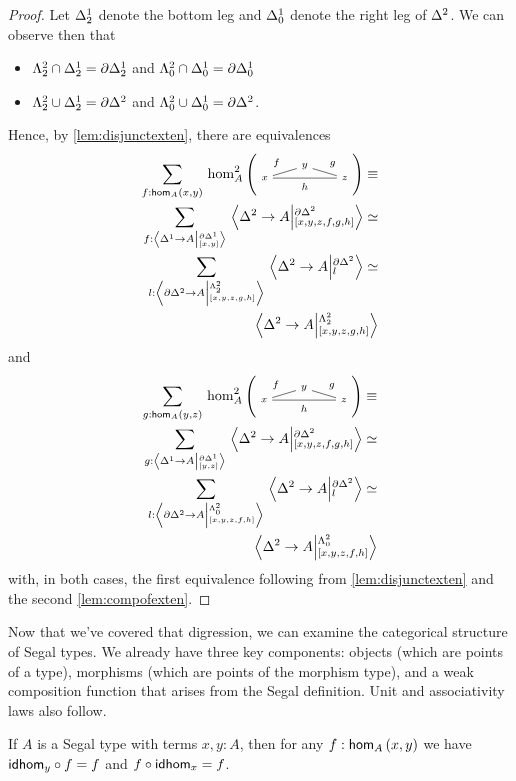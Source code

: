 \documentclass[main.tex]{subfiles}
\begin{document}
    \begin{proof}
        Let $\osx_{2}$ denote the bottom leg and $\osx_{0}$ denote the right leg of $\tsx$. We can observe then that 
        \begin{itemize}
            \item $\tthorn \cap \osx_{2} = \partial \osx_{2}$ and $\tzhorn \cap \osx_{0} = \partial \osx_{0}$
            \item $\tthorn \cup \osx_{2} = \pardt$ and $\tzhorn \cup \osx_{0} = \pardt$.
        \end{itemize}
        Hence, by \cref{lem:disjunctexten}, there are equivalences
        \begin{align*}
            \sm{f : \ho[A]{x}{y}}\homtwo{A}(x,y,z,f,g,h) \equiv \\
            \sm{f : \ndexten{\osx}{A}{\pardo}{[x,y]}}\ndexten{\tsx}{A}{\pardt}{[x,y,z,f,g,h]} \simeq \\
            \sm{l : \ndexten{\pardt}{A}{\tthorn}{[x,y,z,g,h]}}\ndexten{\tsx}{A}{\pardt}{l} \simeq\\ 
            \ndexten{\tsx}{A}{\tthorn}{[x,y,z,g,h]}
        \end{align*}
        and 
        \begin{align*}
            \sm{g : \ho[A]{y}{z}}\homtwo{A}(x,y,z,f,g,h)\equiv \\
            \sm{g : \ndexten{\osx}{A}{\pardo}{[y,z]}}\ndexten{\tsx}{A}{\pardt}{[x,y,z,f,g,h]} \simeq \\
            \sm{l : \ndexten{\pardt}{A}{\tzhorn}{[x,y,z,f,h]}}\ndexten{\tsx}{A}{\pardt}{l} \simeq \\
            \ndexten{\tsx}{A}{\tzhorn}{[x,y,z,f,h]}
        \end{align*}
        with, in both cases, the first equivalence following from \cref{lem:disjunctexten} and the second \cref{lem:compofexten}.
    \end{proof}

Now that we've covered that digression, we can examine the categorical structure of Segal types. We already have three key components: objects (which are points of a type), morphisms (which are points of the morphism type), and a weak composition function that arises from the Segal definition. Unit and associativity laws also follow.

\begin{lemma}
    If $A$ is a Segal type with terms $x,y : A$, then for any $f : \ho[A]{x}{y}$ we have $\idhom{y}\circ f = f$ and $f \circ \idhom{x} = f$.
\end{lemma}
\end{document}
